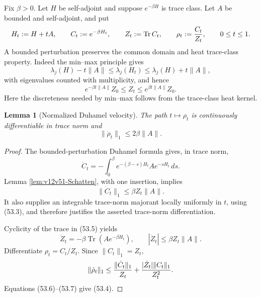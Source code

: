 \documentclass[11pt]{article}
\newtheorem{lemma}[theorem]{Lemma}
\theoremstyle{remark}
\begin{document}
Fix \(\beta>0\).  Let \(H\) be self-adjoint and suppose
\(e^{-\beta H}\) is trace class.  Let \(A\) be bounded and
self-adjoint, and put
\[
 H_t:=H+tA,\qquad
 C_t:=e^{-\beta H_t},\qquad
 Z_t:=\operatorname{Tr}C_t,\qquad
 \rho_t:={C_t\over Z_t},
 \qquad0\leq t\leq1.
\]
A bounded perturbation preserves the common domain and heat
trace-class property.  Indeed the min--max principle gives
\[
 \lambda_j(H)-t\|A\|
 \leq\lambda_j(H_t)
 \leq\lambda_j(H)+t\|A\|,
\]
with eigenvalues counted with multiplicity, and hence
\begin{equation}
 e^{-\beta t\|A\|}Z_0
 \leq Z_t\leq
 e^{\beta t\|A\|}Z_0.                             \tag{53.3}
\end{equation}
Here the discreteness needed by min--max follows from the
trace-class heat kernel.

\begin{lemma}[Normalized Duhamel velocity]
\label{lem:v12v53-velocity}
The path \(t\mapsto\rho_t\) is continuously differentiable in trace
norm and
\begin{equation}
 \|\dot\rho_t\|_1\leq2\beta\|A\|.
                                                            \tag{53.4}
\end{equation}
\end{lemma}

\begin{proof}
The bounded-perturbation Duhamel formula gives, in trace norm,
\begin{equation}
 \dot C_t
 =
 -\int_0^\beta
 e^{-(\beta-s)H_t}A e^{-sH_t}\,ds.                \tag{53.5}
\end{equation}
Lemma \ref{lem:v12v51-Schatten}, with one insertion, implies
\begin{equation}
 \|\dot C_t\|_1\leq\beta Z_t\|A\|.                \tag{53.6}
\end{equation}
It also supplies an integrable trace-norm majorant locally uniformly
in \(t\), using (53.3), and therefore justifies the asserted
trace-norm differentiation.

Cyclicity of the trace in (53.5) yields
\begin{equation}
 \dot Z_t
 =
 -\beta\operatorname{Tr}(A e^{-\beta H_t}),
 \qquad
 |\dot Z_t|\leq\beta Z_t\|A\|.                    \tag{53.7}
\end{equation}
Differentiate \(\rho_t=C_t/Z_t\).  Since
\(\|C_t\|_1=Z_t\),
\[
 \|\dot\rho_t\|_1
 \leq
 {\|\dot C_t\|_1\over Z_t}
 +
 {|\dot Z_t|\|C_t\|_1\over Z_t^2}.
\]
Equations (53.6)--(53.7) give (53.4).
\end{proof}
\end{document}
